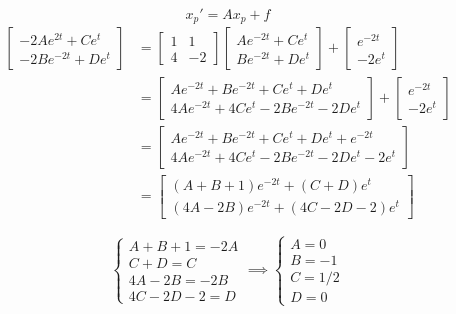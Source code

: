 \documentclass[12pt]{article}
\begin{document}
\[x_p' = Ax_p + f\]
\begin{align*}
    \begin{bmatrix}
        -2Ae^{2t} + Ce^t\\
        -2Be^{-2t} + De^t
    \end{bmatrix} &= \begin{bmatrix}
    1 & 1\\
    4 & -2
    \end{bmatrix} \begin{bmatrix}
        Ae^{-2t} + Ce^t\\
        Be^{-2t} + De^t
    \end{bmatrix} + \begin{bmatrix}
        e^{-2t}\\
        -2e^t
    \end{bmatrix}\\
    &= \begin{bmatrix}
        Ae^{-2t} + Be^{-2t} + Ce^t + De^t\\
        4Ae^{-2t} + 4Ce^t - 2Be^{-2t} - 2De^t
    \end{bmatrix} + \begin{bmatrix}
        e^{-2t}\\
        -2e^t
    \end{bmatrix}\\
    &= \begin{bmatrix}
        Ae^{-2t} + Be^{-2t} + Ce^t + De^t + e^{-2t}\\
        4Ae^{-2t} + 4Ce^t - 2Be^{-2t} - 2De^t -2e^t
    \end{bmatrix}\\
    &= \begin{bmatrix}
        (A + B + 1)e^{-2t} + (C + D)e^t\\
        (4A - 2B)e^{-2t} + (4C - 2D - 2)e^t
    \end{bmatrix}
\end{align*}

\[\begin{cases}
    A + B + 1 = -2A\\
    C + D = C\\
    4A - 2B = -2B\\
    4C - 2D - 2 = D
\end{cases} \implies \begin{cases}
    A = 0\\
    B = -1\\
    C = 1/2\\
    D = 0
\end{cases}\]
\end{document}
